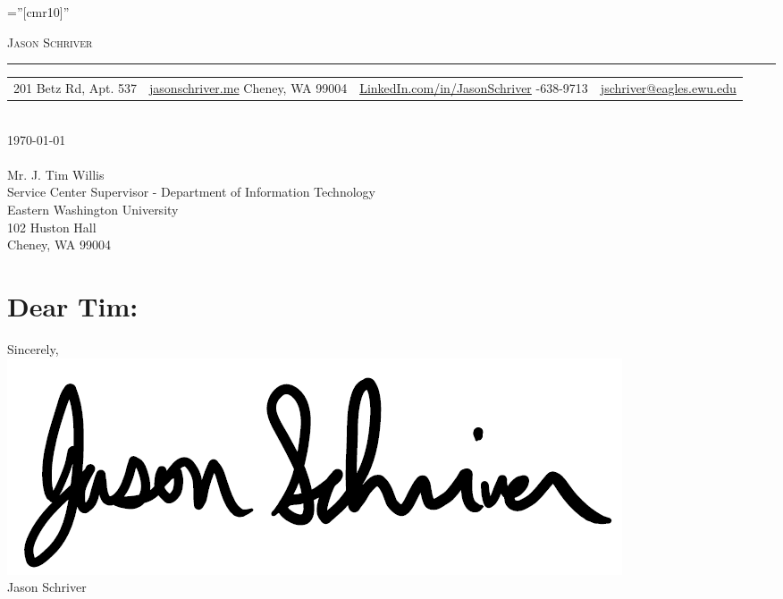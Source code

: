 \documentclass[a4paper,10pt]{article}
\begin{document}

\pagestyle{empty} %

\font\fb=''[cmr10]'' %

{\begin{center}
\textsc		{\Large Jason Schriver}
\end{center}}

\hrule
\begin{tabularx}{\textwidth}{X|X}
	201 Betz Rd, Apt. 537 & \href{https://jasonschriver.me}{jasonschriver.me} \cr
	Cheney, WA 99004 & \raggedright \href{https://linkedin.com/in/JasonSchriver}{LinkedIn.com/in/JasonSchriver} -638-9713 & \raggedright \href{mailto:jschriver@eagles.ewu.edu}{jschriver@eagles.ewu.edu} \cr
\end{tabularx}
\\
\today\\
\\
Mr. J. Tim Willis\\
Service Center Supervisor - Department of Information Technology\\
Eastern Washington University\\
102 Huston Hall\\
Cheney, WA 99004

\section{Dear Tim:}




Sincerely,\\
\includegraphics[scale=.25]{signature}\\
Jason Schriver

\end{document}
